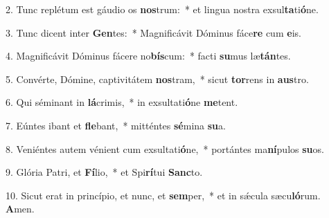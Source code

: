 2. Tunc replétum est gáudio os \textbf{nos}trum:~*  et lingua nostra exsul\textbf{ta}ti\textbf{ó}ne.\

3. Tunc dicent inter \textbf{Gen}tes:~*  Magnificávit Dóminus fáce\textbf{re} cum \textbf{e}is.\

4. Magnificávit Dóminus fácere no\textbf{bís}cum:~*  facti \textbf{su}mus læ\textbf{tán}tes.\

5. Convérte, Dómine, captivitátem \textbf{nos}tram,~*  sicut \textbf{tor}rens in \textbf{aus}tro.\

6. Qui séminant in \textbf{lá}crimis,~*  in exsultati\textbf{ó}ne \textbf{me}tent.\

7. Eúntes ibant et \textbf{fle}bant,~*  mitténtes \textbf{sé}mina \textbf{su}a.\

8. Veniéntes autem vénient cum exsultati\textbf{ó}ne,~*  portántes ma\textbf{ní}pulos \textbf{su}os.\

9. Glória Patri, et \textbf{Fí}lio,~*  et Spi\textbf{rí}tui \textbf{Sanc}to.\

10. Sicut erat in princípio, et nunc, et \textbf{sem}per,~*  et in sǽcula sæcu\textbf{ló}rum. \textbf{A}men.\

